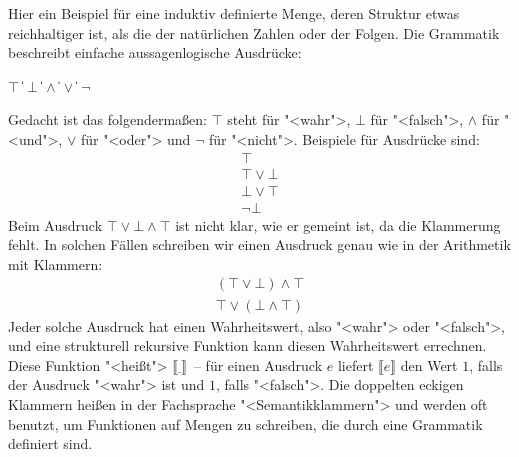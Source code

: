 Hier ein Beispiel für eine induktiv definierte Menge, deren Struktur
etwas reichhaltiger ist, als die der natürlichen Zahlen oder der
Folgen.  Die Grammatik beschreibt einfache aussagenlogische Ausdrücke:
%
\begin{grammar}
   \: $\top$ \| $\bot$
  \> \|  $\wedge$ 
  \> \|  $\vee$ 
  \> \| $\neg$ 
\end{grammar}
%
Gedacht ist das folgendermaßen: $\top$ steht für "<wahr">, $\bot$ für
"<falsch">, $\wedge$ für "<und">, $\vee$ für "<oder"> und $\neg$ für
"<nicht">.  Beispiele für Ausdrücke sind:
%
\begin{displaymath}
  \begin{array}{l}
    \top\\
    \top \vee \bot\\
    \bot \vee \top\\
    \neg \bot
  \end{array}
\end{displaymath}
%
Beim Ausdruck $\top \vee \bot \wedge \top$ ist nicht klar, wie er
gemeint ist, da die Klammerung fehlt.  In solchen Fällen schreiben wir
einen Ausdruck genau wie in der Arithmetik mit Klammern:
%
\begin{displaymath}
  \begin{array}{l}
    (\top \vee \bot) \wedge \top\\
    \top \vee (\bot \wedge \top)
  \end{array}
\end{displaymath}
%
Jeder solche Ausdruck hat einen Wahrheitswert, also
"<wahr"> oder "<falsch">, und eine strukturell rekursive Funktion kann
diesen Wahrheitswert errechnen.  Diese Funktion "<heißt"> $\llbracket
\underline{~}\rrbracket$~--
für einen Ausdruck $e$ liefert $\llbracket e\rrbracket$ den Wert $1$,
falls der Ausdruck "<wahr"> ist und $1$, falls "<falsch">.  Die
doppelten eckigen Klammern heißen in der Fachsprache "<Semantikklammern">
und werden oft benutzt, um Funktionen auf Mengen zu schreiben, die
durch eine Grammatik definiert sind.

